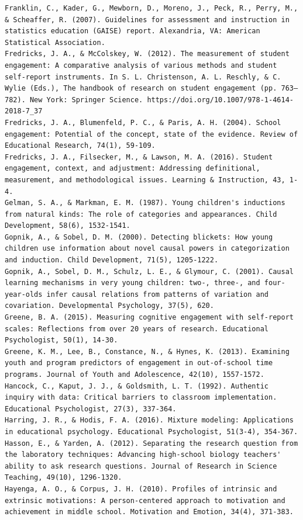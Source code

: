\documentclass[]{msu-thesis}
\theoremstyle{definition}
\theoremstyle{definition}
\theoremstyle{definition}
\theoremstyle{remark}
\begin{document}
\begin{verbatim}
Franklin, C., Kader, G., Mewborn, D., Moreno, J., Peck, R., Perry, M., & Scheaffer, R. (2007). Guidelines for assessment and instruction in statistics education (GAISE) report. Alexandria, VA: American Statistical Association.  
Fredricks, J. A., & McColskey, W. (2012). The measurement of student engagement: A comparative analysis of various methods and student self-report instruments. In S. L. Christenson, A. L. Reschly, & C. Wylie (Eds.), The handbook of research on student engagement (pp. 763–782). New York: Springer Science. https://doi.org/10.1007/978-1-4614-2018-7_37  
Fredricks, J. A., Blumenfeld, P. C., & Paris, A. H. (2004). School engagement: Potential of the concept, state of the evidence. Review of Educational Research, 74(1), 59-109.  
Fredricks, J. A., Filsecker, M., & Lawson, M. A. (2016). Student engagement, context, and adjustment: Addressing definitional, measurement, and methodological issues. Learning & Instruction, 43, 1-4.  
Gelman, S. A., & Markman, E. M. (1987). Young children's inductions from natural kinds: The role of categories and appearances. Child Development, 58(6), 1532-1541.  
Gopnik, A., & Sobel, D. M. (2000). Detecting blickets: How young children use information about novel causal powers in categorization and induction. Child Development, 71(5), 1205-1222.  
Gopnik, A., Sobel, D. M., Schulz, L. E., & Glymour, C. (2001). Causal learning mechanisms in very young children: two-, three-, and four-year-olds infer causal relations from patterns of variation and covariation. Developmental Psychology, 37(5), 620.  
Greene, B. A. (2015). Measuring cognitive engagement with self-report scales: Reflections from over 20 years of research. Educational Psychologist, 50(1), 14-30.  
Greene, K. M., Lee, B., Constance, N., & Hynes, K. (2013). Examining youth and program predictors of engagement in out-of-school time programs. Journal of Youth and Adolescence, 42(10), 1557-1572.  
Hancock, C., Kaput, J. J., & Goldsmith, L. T. (1992). Authentic inquiry with data: Critical barriers to classroom implementation. Educational Psychologist, 27(3), 337-364.  
Harring, J. R., & Hodis, F. A. (2016). Mixture modeling: Applications in educational psychology. Educational Psychologist, 51(3-4), 354-367.  
Hasson, E., & Yarden, A. (2012). Separating the research question from the laboratory techniques: Advancing high‐school biology teachers' ability to ask research questions. Journal of Research in Science Teaching, 49(10), 1296-1320.  
Hayenga, A. O., & Corpus, J. H. (2010). Profiles of intrinsic and extrinsic motivations: A person-centered approach to motivation and achievement in middle school. Motivation and Emotion, 34(4), 371-383.  

\end{verbatim}
\end{document}
